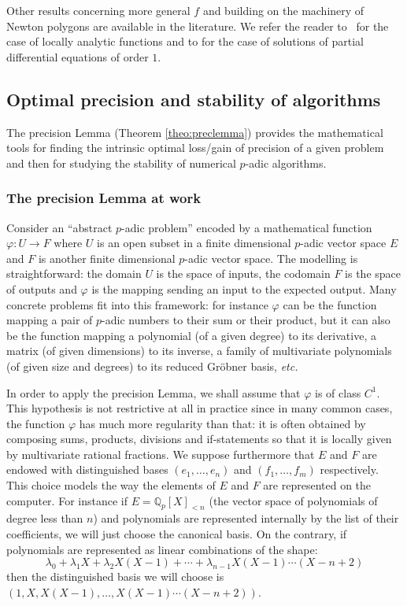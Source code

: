 \documentclass[11pt]{article}
\numberwithin{equation}{section}
\numberwithin{figure}{section}
\theoremstyle{definition}
\newcommand{\Q}{\mathbb Q}
\newcommand{\Qp}{\Q_p}
\begin{document}
Other results concerning more general $f$ and building on the machinery 
of Newton polygons are available in the literature. We refer the reader 
to~\cite{CaRoVa14} for the case of locally analytic functions and to 
\cite{CaRoVa15} for the case of solutions of partial differential equations of 
order $1$.

\subsection{Optimal precision and stability of algorithms}
\label{ssec:optimalprec}

The precision Lemma (Theorem \ref{theo:preclemma}) provides the 
mathematical tools for finding the intrinsic optimal loss/gain of 
precision of a given problem and then for studying the stability 
of numerical $p$-adic algorithms.

\subsubsection{The precision Lemma at work}
\label{sssec:preclemmaatwork}

Consider an ``abstract $p$-adic problem'' encoded by a mathematical 
function $\varphi : U \to F$ where $U$ is an open subset in a finite 
dimensional $p$-adic vector space $E$ and $F$ is another finite
dimensional $p$-adic vector space.
The modelling is straightforward: the domain $U$ is the space of 
inputs, the codomain $F$ is the space of outputs and $\varphi$ is 
the mapping sending an input to the expected output.
Many concrete problems fit into this framework: for instance $\varphi$ 
can be the function mapping a pair of $p$-adic numbers to their sum
or their product, but it can also be the function mapping a polynomial
(of a given degree) to its derivative, a matrix (of given dimensions) 
to its inverse, a family of multivariate polynomials (of given size and 
degrees) to its reduced Gröbner basis, \emph{etc.}

In order to apply the precision Lemma, we shall assume that $\varphi$ is 
of class $C^1$. This hypothesis is not restrictive at all in practice 
since in many common cases, the function $\varphi$ has much more 
regularity than that: it is often obtained by composing sums, products, 
divisions and if-statements so that it is locally given by 
multivariate rational fractions.
We suppose furthermore that $E$ and $F$ are endowed with distinguished 
bases $(e_1, \ldots, e_n)$ and $(f_1, \ldots, f_m)$ respectively. This
choice models the way the elements of $E$ and $F$ are represented on the 
computer. For instance if $E = \Qp[X]_{< n}$ (the vector space of
polynomials of degree less than $n$) and polynomials are represented
internally by the list of their coefficients, we will just choose the
canonical basis. On the contrary, if polynomials are represented as
linear combinations of the shape:
$$\lambda_0 + \lambda_1 X + \lambda_2 X(X{-}1) + \cdots +
\lambda_{n-1} X (X{-}1) \cdots (X{-}n{+}2)$$
then the distinguished basis we will choose is $(1, X, X(X{-}1), \ldots,
X (X{-}1) \cdots (X{-}n{+}2))$.
\end{document}
